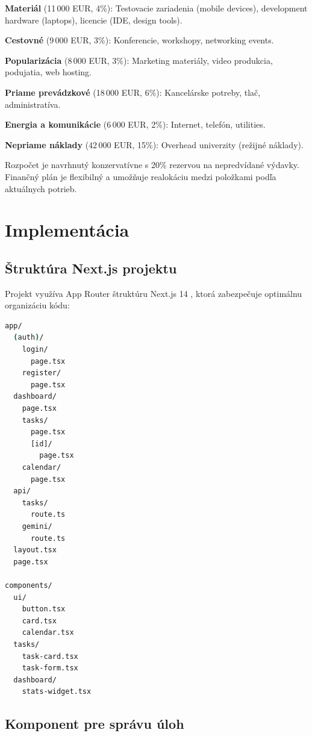 \documentclass[10pt,twocolumn,twoside,slovak,a4paper]{article}
\begin{document}
\textbf{Materiál} (11\,000 EUR, 4\%): Testovacie zariadenia (mobile devices), development hardware (laptops), licencie (IDE, design tools).

\textbf{Cestovné} (9\,000 EUR, 3\%): Konferencie, workshopy, networking events.

\textbf{Popularizácia} (8\,000 EUR, 3\%): Marketing materiály, video produkcia, podujatia, web hosting.

\textbf{Priame prevádzkové} (18\,000 EUR, 6\%): Kancelárske potreby, tlač, administratíva.

\textbf{Energia a komunikácie} (6\,000 EUR, 2\%): Internet, telefón, utilities.

\textbf{Nepriame náklady} (42\,000 EUR, 15\%): Overhead univerzity (režijné náklady).

Rozpočet je navrhnutý konzervatívne s 20\% rezervou na nepredvídané výdavky. Finančný plán je flexibilný a umožňuje realokáciu medzi položkami podľa aktuálnych potrieb.

\onecolumn

\section{Implementácia}

\subsection{Štruktúra Next.js projektu}

Projekt využíva App Router štruktúru Next.js 14 \cite{nextjs-docs}, ktorá zabezpečuje optimálnu organizáciu kódu:

\begin{lstlisting}[language=bash, caption=Adresarova struktura frontendu]
app/
  (auth)/
    login/
      page.tsx
    register/
      page.tsx
  dashboard/
    page.tsx
    tasks/
      page.tsx
      [id]/
        page.tsx
    calendar/
      page.tsx
  api/
    tasks/
      route.ts
    gemini/
      route.ts
  layout.tsx
  page.tsx

components/
  ui/
    button.tsx
    card.tsx
    calendar.tsx
  tasks/
    task-card.tsx
    task-form.tsx
  dashboard/
    stats-widget.tsx
\end{lstlisting}

\subsection{Komponent pre správu úloh}
\end{document}
